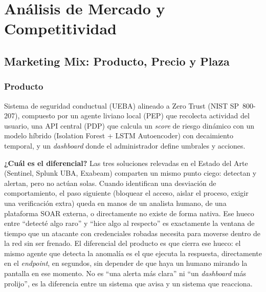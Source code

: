 \clearpage
\chapter{Análisis de Mercado y Competitividad}

\section{Marketing Mix: Producto, Precio y Plaza}

\subsection{Producto}
Sistema de seguridad conductual (UEBA) alineado a Zero Trust (NIST SP~800-207), compuesto por un agente liviano local (PEP) que recolecta actividad del usuario, una API central (PDP) que calcula un \emph{score} de riesgo dinámico con un modelo híbrido (Isolation Forest + LSTM Autoencoder) con decaimiento temporal, y un \emph{dashboard} donde el administrador define umbrales y acciones.

\noindent\textbf{¿Cuál es el diferencial?} Las tres soluciones relevadas en el Estado del Arte (Sentinel, Splunk UBA, Exabeam) comparten un mismo punto ciego: detectan y alertan, pero no actúan solas. Cuando identifican una desviación de comportamiento, el paso siguiente (bloquear el acceso, aislar el proceso, exigir una verificación extra) queda en manos de un analista humano, de una plataforma SOAR externa, o directamente no existe de forma nativa. Ese hueco entre ``detecté algo raro'' y ``hice algo al respecto'' es exactamente la ventana de tiempo que un atacante con credenciales robadas necesita para moverse dentro de la red sin ser frenado. El diferencial del producto es que cierra ese hueco: el mismo agente que detecta la anomalía es el que ejecuta la respuesta, directamente en el \emph{endpoint}, en segundos, sin depender de que haya un humano mirando la pantalla en ese momento. No es ``una alerta más clara'' ni ``un \emph{dashboard} más prolijo'', es la diferencia entre un sistema que avisa y un sistema que reacciona.



